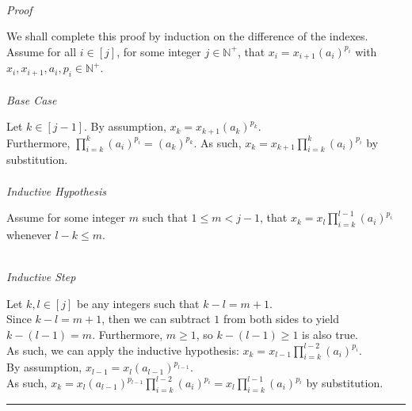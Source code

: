 \documentclass[a4paper,12pt]{article}
\begin{document}
\noindent\\
\textit{Proof}

\noindent We shall complete this proof by induction on the difference of the indexes.\\

\noindent Assume for all $i \in [j]$, for some integer $j \in \mathbb{N}^+$, that $x_i = x_{i + 1}(a_i)^{p_i}$ with $x_i, x_{i + 1}, a_i, p_i \in \mathbb{N}^+$.\\

\noindent\\
\textit{Base Case}

\noindent Let $k \in [j - 1]$. By assumption, $x_k = x_{k + 1}(a_k)^{p_k}$.\\

\noindent Furthermore, $\displaystyle \prod_{i = k}^{k}(a_i)^{p_i} = (a_k)^{p_k}$. As such, $\displaystyle x_k = x_{k + 1} \prod_{i = k}^{k}(a_i)^{p_i}$ by substitution.\\


\noindent \\
\textit{Inductive Hypothesis}

\noindent Assume for some integer $m$ such that $1 \leq m < j - 1$, that $\displaystyle x_k = x_l \prod_{i = k}^{l - 1} (a_i)^{p_i}$ whenever $l - k \leq m$.

\noindent \\
\textit{Inductive Step}

\noindent Let $k, l \in [j]$ be any integers such that $k - l = m + 1$.\\

\noindent Since $k - l = m + 1$, then we can subtract $1$ from both sides to yield $k - (l - 1) = m$. Furthermore, $m \geq 1$, so $k - (l - 1) \geq 1$ is also true.\\

\noindent As such, we can apply the inductive hypothesis: $\displaystyle x_k = x_{l - 1} \prod_{i = k}^{l - 2}(a_i)^{p_i}$.\\

\noindent By assumption, $x_{l - 1} = x_l(a_{l - 1})^{p_{l - 1}}$.\\

\noindent As such, $\displaystyle x_k = x_l(a_{l - 1})^{p_{l - 1}} \prod_{i = k}^{l - 2}(a_i)^{p_i} = x_l \prod_{i = k}^{l - 1}(a_i)^{p_i}$ by substitution.

\begin{center}
\noindent\rule{8cm}{0.4pt}
\end{center}
\noindent \\
\end{document}
